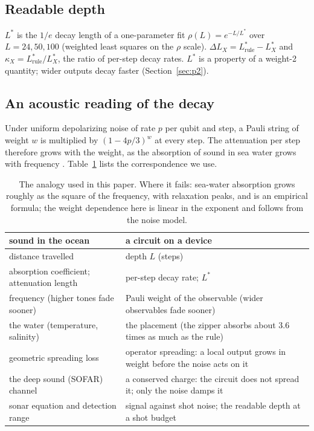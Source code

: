 \documentclass[11pt]{article}
\begin{document}
\subsection{Readable depth}
$L^*$ is the $1/e$ decay length of a one-parameter fit $\rho(L)=e^{-L/L^*}$ over $L=24,50,100$ (weighted least squares
on the $\rho$ scale). $\Delta L_X=L^*_{\mathrm{rule}}-L^*_X$ and $\kappa_X=L^*_{\mathrm{rule}}/L^*_X$, the ratio of
per-step decay rates. $L^*$ is a property of a weight-2 quantity; wider outputs decay faster (Section~\ref{sec:p2}).

\subsection{An acoustic reading of the decay}\label{sec:acoustic}
Under uniform depolarizing noise of rate $p$ per qubit and step, a Pauli string of weight $w$ is multiplied by
$(1-4p/3)^{w}$ at every step. The attenuation per step therefore grows with the weight, as the absorption of sound in
sea water grows with frequency \cite{francois1982}. Table~\ref{tab:acoustic} lists the correspondence we use.

\begin{table}[h]
\centering
\small
\begin{tabular}{p{}p{}}
\toprule
sound in the ocean & a circuit on a device\\
\midrule
distance travelled & depth $L$ (steps)\\
absorption coefficient; attenuation length & per-step decay rate; $L^*$\\
frequency (higher tones fade sooner) & Pauli weight of the observable (wider observables fade sooner)\\
the water (temperature, salinity) & the placement (the zipper absorbs about 3.6 times as much as the rule)\\
geometric spreading loss & operator spreading: a local output grows in weight before the noise acts on it\\
the deep sound (SOFAR) channel & a conserved charge: the circuit does not spread it; only the noise damps it\\
sonar equation and detection range & signal against shot noise; the readable depth at a shot budget\\
\bottomrule
\end{tabular}
\caption{The analogy used in this paper. Where it fails: sea-water absorption grows roughly as the square of the
frequency, with relaxation peaks, and is an empirical formula; the weight dependence here is linear in the exponent
and follows from the noise model.}\label{tab:acoustic}
\end{table}
\end{document}
